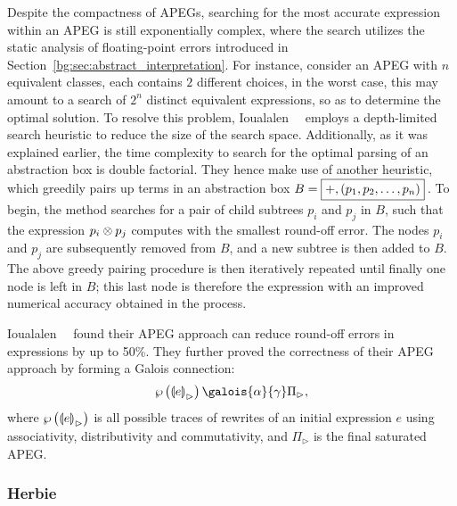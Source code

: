 Despite the compactness of APEGs, searching for the most accurate
expression within an APEG is still exponentially complex, where the search
utilizes the static analysis of floating-point errors introduced in
Section~\ref{bg:sec:abstract_interpretation}.  For instance, consider an
APEG with $n$ equivalent classes, each contains $2$ different choices, in
the worst case, this may amount to a search of $2^n$ distinct equivalent
expressions, so as to determine the optimal solution.  To resolve this problem,
Ioualalen~\etal~\cite{ioualalen} employs a depth-limited search heuristic to
reduce the size of the search space\footnotemark[2].  Additionally, as it was
explained earlier, the time complexity to search for the optimal parsing of an
abstraction box is double factorial.  They hence make use of another heuristic,
which greedily pairs up terms in an abstraction box $B = \text{\fbox{$+,
\left(p_1, p_2, \mathellipsis, p_n\right)$}}$\,.  To begin, the method searches
for a pair of child subtrees $p_i$ and $p_j$ in $B$, such that the expression
$p_i \otimes p_j$ computes with the smallest round-off error.  The nodes
$p_i$ and $p_j$ are subsequently removed from $B$, and a new subtree
is then added to $B$.  The above greedy pairing procedure is then iteratively
repeated until finally one node is left in $B$; this last node is therefore
the expression with an improved numerical accuracy obtained in the process.

Ioualalen~\etal~\cite{ioualalen} found their APEG approach can reduce round-off
errors in expressions by up to 50\%.  They further proved the correctness of
their APEG approach by forming a Galois connection:
\begin{equation}
    \powersetof{{\llparenthesis e \rrparenthesis}_\rhd}
    \galois{\alpha}{\gamma}
    \Pi_\rhd,
\end{equation}
where $\wp\left({{\llparenthesis e \rrparenthesis}_\rhd}\right)$ is all possible
traces of rewrites of an initial expression $e$ using associativity,
distributivity and commutativity, and $\Pi_\rhd$ is the final saturated APEG\@.

\subsubsection{Herbie}

